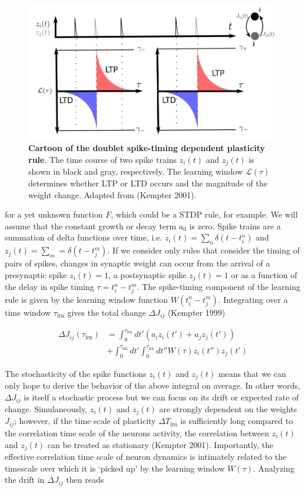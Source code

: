 \documentclass{ucetd}
\begin{document}
\begin{figure}[t!]
\centering
\includegraphics[width=150mm]{figure-5}
\caption{\textbf{Cartoon of the doublet spike-timing dependent plasticity rule}. The time course of two spike trains $z_{i}(t)$ and $z_{j}(t)$ is shown in black and gray, respectively. The learning window $\mathcal{L}(\tau)$ determines whether LTP or LTD occurs and the magnitude of the weight change. Adapted from (Kempter 2001).}
\end{figure}

for a yet unknown function $F$, which could be a STDP rule, for example. We will assume that the constant growth or decay term $a_{0}$ is zero. Spike trains are a summation of delta functions over time, i.e. $z_{i}(t) = \sum_{n} \delta(t-t_{i}^{n})$ and $z_{j}(t) = \sum_{m} = \delta(t-t_{j}^{m})$. If we consider only rules that consider the timing of pairs of spikes, changes in synaptic weight can occur from the arrival of a presynaptic spike $z_{i}(t) = 1$, a postsynaptic spike $z_{j}(t) = 1$ or as a function of the delay in spike timing  $\tau = t_{i}^{n} - t_{j}^{m}$. The spike-timing component of the learning rule is given by the learning window function $W(t_{i}^{n} - t_{j}^{m})$. Integrating over a time window $\tau_{\mathrm{lrn}}$ gives the total change $\Delta J_{ij}$ (Kempter 1999)


\begin{align}
\Delta J_{ij}(\tau_{\mathrm{lrn}}) &= \int_{0}^{\tau_{\mathrm{lrn}}} dt'\left(a_{i}z_{i}(t') + a_{j}z_{j}(t')\right) \\
&+ \int_{0}^{\tau_{\mathrm{lrn}}} dt'\int_{0}^{\tau_{\mathrm{lrn}}} dt''W(\tau)z_{i}(t'')z_{j}(t')
\end{align}

The stochasticity of the spike functions $z_{i}(t)$ and $z_{j}(t)$ means that we can only hope to derive the behavior of the above integral on average. In other words, $\Delta J_{ij}$ is itself a stochastic process but we can focus on its drift or expected rate of change. Simulaneously, $z_{i}(t)$ and $z_{j}(t)$ are strongly dependent on the weights $J_{ij}$; however, if the time scale of plasticity $\Delta T_{\mathrm{lrn}}$ is sufficiently long compared to the correlation time scale of the neurons activity, the correlation between $z_{i}(t)$ and $z_{j}(t)$ can be treated as stationary (Kempter 2001). Importantly, the effective correlation time scale of neuron dynamics is intimately related to the timescale over which it is `picked up' by the learning window $W(\tau)$. Analyzing the drift in $\Delta J_{ij}$ then reads
\end{document}
